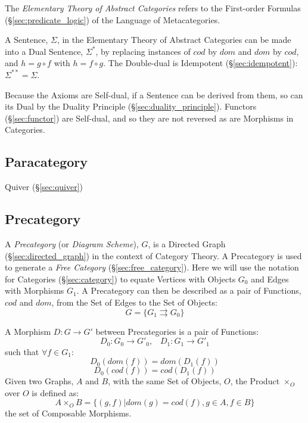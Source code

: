 The \emph{Elementary Theory of Abstract Categories} refers to the
First-order Formulas (\S\ref{sec:predicate_logic}) of the Language
of Metacategories.

A Sentence, $\Sigma$, in the Elementary Theory of Abstract Categories
can be made into a Dual Sentence, $\Sigma^*$, by replacing instances
of $cod$ by $dom$ and $dom$ by $cod$, and $h = g \circ f$ with $h = f
\circ g$. The Double-dual is Idempotent (\S\ref{sec:idempotent}):
$\Sigma^{**} = \Sigma$.

Because the Axioms are Self-dual, if a Sentence can be derived from
them, so can its Dual by the Duality Principle
(\S\ref{sec:duality_principle}). Functors (\S\ref{sec:functor}) are
Self-dual, and so they are not reversed as are Morphisms in
Categories.



\subsection{Paracategory}\label{sec:paracategory}

Quiver (\S\ref{sec:quiver})



\subsection{Precategory}\label{sec:precategory}

A \emph{Precategory} (or \emph{Diagram Scheme}), $G$, is a Directed
Graph (\S\ref{sec:directed_graph}) in the context of Category
Theory. A Precategory is used to generate a \emph{Free Category}
(\S\ref{sec:free_category}). Here we will use the notation for
Categories (\S\ref{sec:category}) to equate Vertices with
Objects $G_0$ and Edges with Morphisms $G_1$. A Precategory can then
be described as a pair of Functions, $cod$ and $dom$, from the Set of
Edges to the Set of Objects:
\[
  G = \{G_1 \rightrightarrows G_0\}
\]

A Morphism $D : G \rightarrow G'$ between Precategories is a pair of
Functions:
\[
  D_0 : G_0 \rightarrow G'_0, \;\;\; D_1 : G_1 \rightarrow G'_1
\]
such that $\forall f \in G_1$:
\[
  D_0(dom(f)) = dom(D_1(f))
\]\[
  D_0(cod(f)) = cod(D_1(f))
\]
Given two Graphs, $A$ and $B$, with the same Set of Objects, $O$, the
Product $\times_O$ over $O$ is defined as:
\[
  A \times_O B = \{ (g,f) | dom(g) = cod(f), g \in A, f \in B \}
\]
the set of Composable Morphisms.

